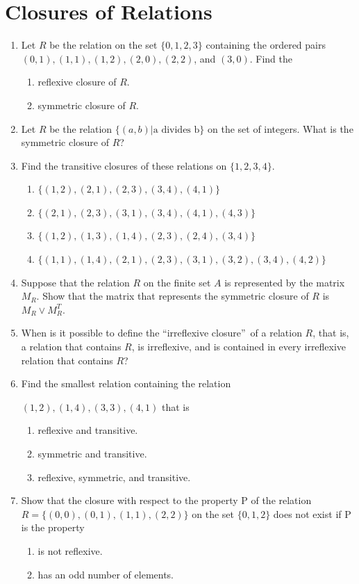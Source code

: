 \documentclass{sig-alternate-05-2015}
\begin{document}
\section{Closures of Relations}
\begin{enumerate}
\item Let $R$ be the relation on the set $\{0, 1, 2, 3\}$ containing the ordered pairs $(0, 1), (1, 1), (1, 2), (2, 0), (2, 2)$, and $(3, 0)$. Find the
	\begin{enumerate}
		\item reflexive closure of $R$.
		\item symmetric closure of $R$.
	\end{enumerate}

\item Let $R$ be the relation $\{(a, b) | \text{a divides b}\}$ on the set of
integers. What is the symmetric closure of $R$?
	
\item Find the transitive closures of these relations on $\{1, 2, 3, 4\}$.
	\begin{enumerate}
		\item $\{(1, 2), (2,1), (2,3), (3,4), (4,1)\}$
		\item $\{(2, 1), (2,3), (3,1), (3,4), (4,1), (4, 3)\}$
		\item $\{(1, 2), (1,3), (1,4), (2,3), (2,4), (3, 4)\}$
		\item $\{(1, 1), (1,4), (2,1), (2,3), (3,1), (3, 2), (3,4), (4, 2)\}$
	\end{enumerate}
	
\item Suppose that the relation $R$ on the finite set $A$ is represented by the matrix $M_R$. Show that the matrix that represents the symmetric closure of $R$ is $M_R \vee M^T_R$.

\item When is it possible to define the \textquotedblleft irreflexive closure\textquotedblright\ of a relation $R$, that is, a relation that contains $R$, is irreflexive,
and is contained in every irreflexive relation
that contains $R$?
	
\item Find the smallest relation containing the relation
	
	${(1, 2), (1, 4), (3, 3), (4, 1)}$ that is
	\begin{enumerate}
		\item reflexive and transitive.
		\item symmetric and transitive.
		\item reflexive, symmetric, and transitive.
	\end{enumerate}
	
\item Show that the closure with respect to the property P of
the relation $R = \{(0, 0), (0, 1), (1, 1), (2, 2)\}$ on the set
$\{0, 1, 2\}$ does not exist if P is the property
	\begin{enumerate}
		\item is not reflexive.
		\item has an odd number of elements.
	\end{enumerate}
\end{enumerate}
\end{document}
